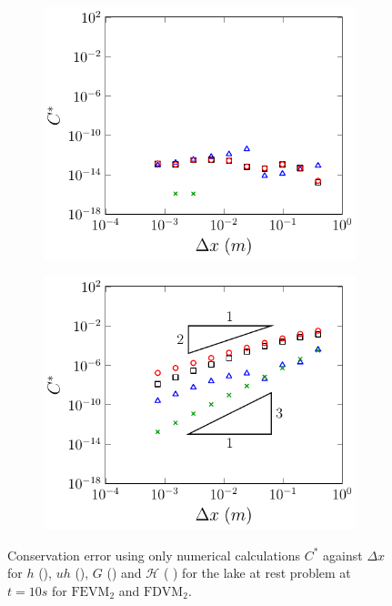 \begin{figure}
\begin{subfigure}{0.5\textwidth}
	\end{subfigure}
	\begin{subfigure}{0.5\textwidth}
		\includegraphics[width=\textwidth]{./chp5/figures/Analytic/LakeAtRest/C1/Num/FDVM2WB.pdf}
	\end{subfigure}%
	\begin{subfigure}{0.5\textwidth}
		\includegraphics[width=\textwidth]{./chp5/figures/Analytic/LakeAtRest/C1/Num/FDVM2nWB.pdf}
	\end{subfigure}
	\caption{Conservation error using only numerical calculations $C^*$ against $\Delta x$ for $h$ (), $uh$ (), $G$ () and $\mathcal{H}$ ({\color{green!60!black} }) for the lake at rest problem at $t=10s$ for $\text{FEVM}_2$ and $\text{FDVM}_2$.}
	\label{fig:LakeAtRestEC*1}
\end{figure}   

